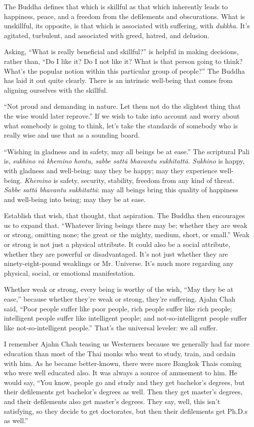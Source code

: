 The Buddha defines that which is skillful as that which inherently leads
to happiness, peace, and a freedom from the defilements and
obscurations. What is unskillful, its opposite, is that which is
associated with suffering, with \emph{dukkha}. It’s agitated, turbulent,
and associated with greed, hatred, and delusion.

Asking, “What is really beneficial and skillful?” is helpful in making
decisions, rather than, “Do I like it? Do I not like it? What is that
person going to think? What’s the popular notion within this particular
group of people?” The Buddha has laid it out quite clearly. There is an
intrinsic well-being that comes from aligning ourselves with the
skillful.

“Not proud and demanding in nature. Let them not do the slightest thing
that the wise would later reprove.” If we wish to take into account and
worry about what somebody is going to think, let’s take the standards of
somebody who is really wise and use that as a sounding board.

“Wishing in gladness and in safety, may all beings be at ease.” The
scriptural Pali is, \emph{sukhino vā khemino hontu, sabbe sattā bhavantu
sukhitattā.} \emph{Sukhino} is happy, with gladness and well-being: may
they be happy; may they experience well-being. \emph{Khemino} is safety,
security, stability, freedom from any kind of threat. \emph{Sabbe sattā
bhavantu sukhitattā}: may all beings bring this quality of happiness and
well-being into being; may they be at ease.

Establish that wish, that thought, that aspiration. The Buddha then
encourages us to expand that. “Whatever living beings there may be;
whether they are weak or strong, omitting none; the great or the mighty,
medium, short, or small.” Weak or strong is not just a physical
attribute. It could also be a social attribute, whether they are
powerful or disadvantaged. It’s not just whether they are
ninety-eight-pound weaklings or Mr. Universe. It’s much more regarding
any physical, social, or emotional manifestation.

Whether weak or strong, every being is worthy of the wish, “May they be
at ease,” because whether they’re weak or strong, they’re suffering.
Ajahn Chah said, “Poor people suffer like poor people, rich people
suffer like rich people; intelligent people suffer like intelligent
people; and not-so-intelligent people suffer like not-so-intelligent
people.” That’s the universal leveler: we all suffer.

I remember Ajahn Chah teasing us Westerners because we generally had far
more education than most of the Thai monks who went to study, train, and
ordain with him. As he became better-known, there were more Bangkok
Thais coming who were well educated also. It was always a source of
amusement to him. He would say, “You know, people go and study and they
get bachelor’s degrees, but their defilements get bachelor’s degrees as
well. Then they get master’s degrees, and their defilements also get
master’s degrees. They say, well, this isn’t satisfying, so they decide
to get doctorates, but then their defilements get Ph.D.s as well.”

